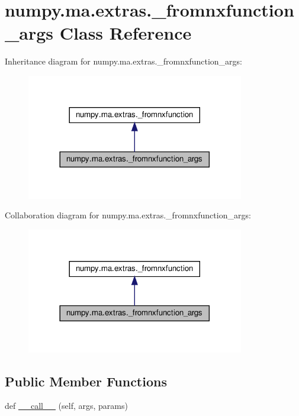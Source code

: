 \hypertarget{classnumpy_1_1ma_1_1extras_1_1__fromnxfunction__args}{}\section{numpy.\+ma.\+extras.\+\_\+fromnxfunction\+\_\+args Class Reference}
\label{classnumpy_1_1ma_1_1extras_1_1__fromnxfunction__args}


Inheritance diagram for numpy.\+ma.\+extras.\+\_\+fromnxfunction\+\_\+args\+:
\nopagebreak
\begin{figure}[H]
\begin{center}
\leavevmode
\includegraphics[width=269pt]{classnumpy_1_1ma_1_1extras_1_1__fromnxfunction__args__inherit__graph}
\end{center}
\end{figure}


Collaboration diagram for numpy.\+ma.\+extras.\+\_\+fromnxfunction\+\_\+args\+:
\nopagebreak
\begin{figure}[H]
\begin{center}
\leavevmode
\includegraphics[width=269pt]{classnumpy_1_1ma_1_1extras_1_1__fromnxfunction__args__coll__graph}
\end{center}
\end{figure}
\subsection*{Public Member Functions}
\begin{DoxyCompactItemize}
\item 
def \hyperlink{classnumpy_1_1ma_1_1extras_1_1__fromnxfunction__args_a432a01769a988011b8959f74066ac5bd}{\+\_\+\+\_\+call\+\_\+\+\_\+} (self, args, params)
\end{DoxyCompactItemize}


